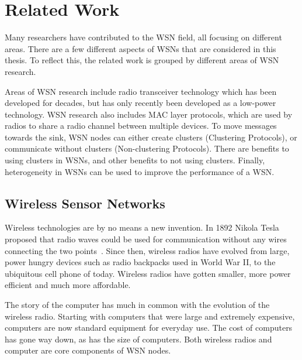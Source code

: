 \chapter{Related Work}
\label{ch:related}

Many researchers have contributed to the WSN field, all focusing on different areas.
There are a few different aspects of WSNs that are considered in this thesis. To reflect this, the 
related work is grouped by different areas of WSN research. 

Areas
of WSN research include radio transceiver technology which has been 
developed for decades, but has only recently been developed as a low-power
technology. WSN research also includes MAC layer protocols, which are used by radios to share 
a radio channel between multiple devices. 
To move messages towards the sink, WSN nodes can either create 
clusters (Clustering Protocols), or communicate without clusters (Non-clustering Protocols).
There are benefits to using clusters in WSNs, and other benefits to not using clusters. 
Finally, heterogeneity in WSNs can be used
to improve the performance of a WSN.


\section{Wireless Sensor Networks}

Wireless technologies are by no means a new invention. In 1892
Nikola Tesla proposed that radio waves could be used for communication
without any wires connecting the two points~\cite{telsa}.
Since then, wireless radios have evolved from large, power 
hungry devices such as radio backpacks used in World War II, to 
the ubiquitous cell phone of today. Wireless radios have gotten smaller,
more power efficient and much more affordable. 

The story of the computer has much in common with the evolution of the 
wireless radio. Starting with computers that were large and extremely expensive, 
computers are now standard equipment for everyday use. The
cost of computers has gone way down, as has the size of computers. Both wireless
radios and computer are core components of WSN nodes.

